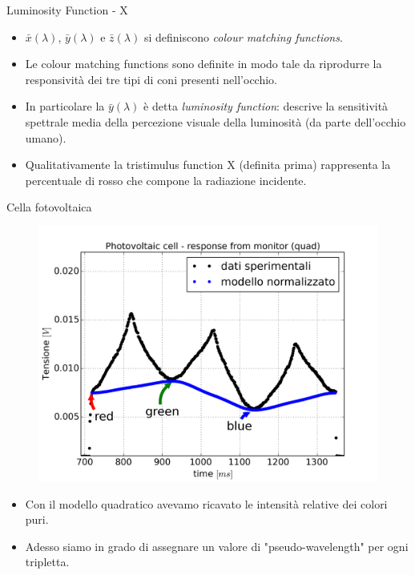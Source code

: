 \documentclass{beamer}
\begin{document}
\begin{frame}{Luminosity Function - X}

\begin{itemize}
\item $\bar{x}(\lambda)$, $\bar{y}(\lambda)$ e $\bar{z}(\lambda)$ si definiscono \emph{colour matching functions}. 
\item Le colour matching functions sono definite in modo tale da riprodurre la responsività dei tre tipi di coni presenti nell'occhio.
\item In particolare la $\bar{y}(\lambda)$ è detta \textit{luminosity function}: descrive la sensitività spettrale media della percezione visuale della luminosità (da parte dell'occhio umano).
\item Qualitativamente la tristimulus function X (definita prima) rappresenta la percentuale di rosso che compone la radiazione incidente. 
\end{itemize}
\end{frame}

\begin{frame}{Cella fotovoltaica}
\begin{figure}
\centering
\label{fig:dati_normal}
\includegraphics[width=0.55\linewidth]{./dati_normal}
\end{figure}

\begin{itemize}
\item Con il modello quadratico avevamo ricavato le intensità relative dei colori puri.
\item Adesso siamo in grado di assegnare un valore di "pseudo-wavelength" per ogni tripletta.
\end{itemize}

\end{frame}
\end{document}
